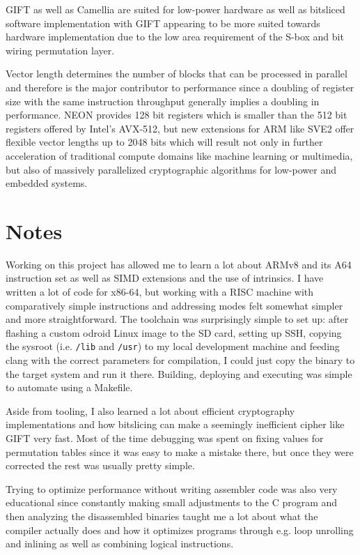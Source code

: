 GIFT as well as Camellia are suited for low-power hardware as well as bitsliced
software implementation with GIFT appearing to be more suited towards hardware
implementation due to the low area requirement of the S-box and bit wiring
permutation layer.

Vector length determines the number of blocks that can be processed in parallel
and therefore is the major contributor to performance since a doubling of
register size with the same instruction throughput generally implies a doubling
in performance. NEON provides 128 bit registers which is smaller than the 512
bit registers offered by Intel's AVX-512, but new extensions for ARM like SVE2
offer flexible vector lengths up to 2048 bits which will result not only in
further acceleration of traditional compute domains like machine learning or
multimedia, but also of massively parallelized cryptographic algorithms for
low-power and embedded systems.

\pagebreak

\section{Notes}

Working on this project has allowed me to learn a lot about ARMv8 and its A64
instruction set as well as SIMD extensions and the use of intrinsics. I have
written a lot of code for x86-64, but working with a RISC machine with
comparatively simple instructions and addressing modes felt somewhat simpler
and more straightforward. The toolchain was surprisingly simple to set up:
after flashing a custom odroid Linux image to the SD card, setting up SSH,
copying the sysroot (i.e. \texttt{/lib} and \texttt{/usr}) to my local
development machine and feeding clang with the correct parameters for
compilation, I could just copy the binary to the target system and run it
there. Building, deploying and executing was simple to automate using a
Makefile.

Aside from tooling, I also learned a lot about efficient cryptography
implementations and how bitslicing can make a seemingly inefficient cipher like
GIFT very fast. Most of the time debugging was spent on fixing values for
permutation tables since it was easy to make a mistake there, but once they
were corrected the rest was usually pretty simple.

Trying to optimize performance without writing assembler code was also very
educational since constantly making small adjustments to the C program and then
analyzing the disassembled binaries taught me a lot about what the compiler
actually does and how it optimizes programs through e.g. loop unrolling and
inlining as well as combining logical instructions.
